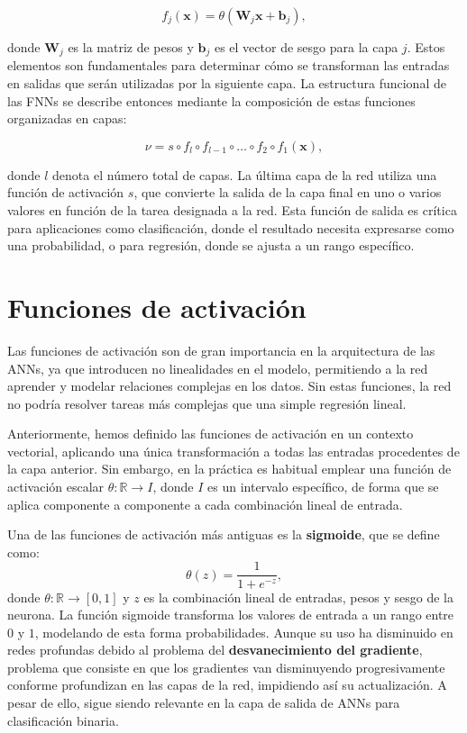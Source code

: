 \[
f_j(\mathbf{x}) = \theta \left( \mathbf{W}_j \mathbf{x} + \mathbf{b}_j \right),
\]

donde \( \mathbf{W}_j \) es la matriz de pesos y \( \mathbf{b}_j \) es el vector de sesgo para la capa \( j \). Estos elementos son fundamentales para determinar cómo se transforman las entradas en salidas que serán utilizadas por la siguiente capa. La estructura funcional de las FNNs se describe entonces mediante la composición de estas funciones organizadas en capas:

\[
\nu = s \circ f_l \circ f_{l-1} \circ \ldots \circ f_2 \circ f_1(\mathbf{x}),
\]

donde \( l \) denota el número total de capas. La última capa de la red utiliza una función de activación \( s \), que convierte la salida de la capa final en uno o varios valores en función de la tarea designada a la red. Esta función de salida es crítica para aplicaciones como clasificación, donde el resultado necesita expresarse como una probabilidad, o para regresión, donde se ajusta a un rango específico.

\section{Funciones de activación}

Las funciones de activación son de gran importancia en la arquitectura de las ANNs, ya que introducen no linealidades en el modelo, permitiendo a la red aprender y modelar relaciones complejas en los datos. Sin estas funciones, la red no podría resolver tareas más complejas que una simple regresión lineal.

Anteriormente, hemos definido las funciones de activación en un contexto vectorial, aplicando una única transformación a todas las entradas procedentes de la capa anterior. Sin embargo, en la práctica es habitual emplear una función de activación escalar \(\theta : \mathbb{R} \rightarrow I\), donde \(I\) es un intervalo específico, de forma que se aplica componente a componente a cada combinación lineal de entrada.

Una de las funciones de activación más antiguas es la \textbf{sigmoide}, que se define como:
\begin{equation}
	\theta(z) = \frac{1}{1 + e^{-z}},
\end{equation}
donde \( \theta : \mathbb{R} \to [0,1] \) y \( z \) es la combinación lineal de entradas, pesos y sesgo de la neurona. La función sigmoide transforma los valores de entrada a un rango entre \(0\) y \(1\), modelando de esta forma probabilidades. Aunque su uso ha disminuido en redes profundas debido al problema del \textbf{desvanecimiento del gradiente}, problema que consiste en que los gradientes van disminuyendo progresivamente conforme profundizan en las capas de la red, impidiendo así su actualización. A pesar de ello, sigue siendo relevante en la capa de salida de ANNs para clasificación binaria.

